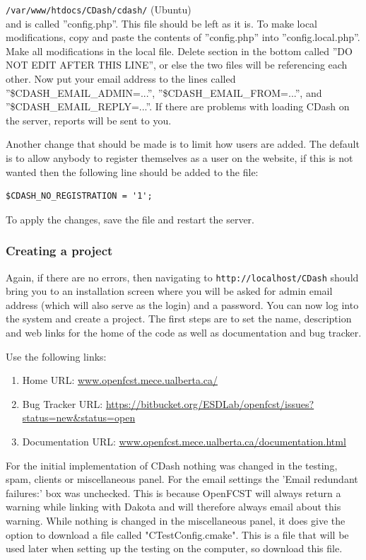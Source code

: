 \noindent \verb!/var/www/htdocs/CDash/cdash/! (Ubuntu)\\

\noindent and is called ''config.php''. This file should be left as it is. To make local modifications, copy and paste the contents of ''config.php'' into ''config.local.php''. Make all modifications in the local file. Delete section in the bottom called ''DO NOT EDIT AFTER THIS LINE'', or else the two files will be referencing each other. Now put your email address to the lines called ''\$CDASH\_EMAIL\_ADMIN=...'', ''\$CDASH\_EMAIL\_FROM=...'', and ''\$CDASH\_EMAIL\_REPLY=...''. If there are problems with loading CDash on the server, reports will be sent to you.

Another change that should be made is to limit how users are added. The default is to allow anybody to register themselves as a user on the website, if this is not wanted then the following line should be added to the file:

\small \begin{lstlisting}
$CDASH_NO_REGISTRATION = '1';
\end{lstlisting}\normalsize

\noindent To apply the changes, save the file and restart the server.

\subsubsection{Creating a project}

Again, if there are no errors, then navigating to \verb!http://localhost/CDash! should bring you to an installation screen where you will be asked for admin email address (which will also serve as the login) and a password. You can now log into the system and create a project. The first steps are to set the name, description and web links for the home of the code as well as documentation and bug tracker. 

Use the following links:

\begin{enumerate}
\item Home URL: \url{www.openfcst.mece.ualberta.ca/}
\item Bug Tracker URL: \url{https://bitbucket.org/ESDLab/openfcst/issues?status=new&status=open}
\item Documentation URL: \url{www.openfcst.mece.ualberta.ca/documentation.html}
\end{enumerate}

For the initial implementation of CDash nothing was changed in the testing, spam, clients or miscellaneous panel. For the email settings the 'Email redundant failures:' box was unchecked. This is because OpenFCST will always return a warning while linking with Dakota and will therefore always email about this warning. While nothing is changed in the miscellaneous panel, it does give the option to download a file called "CTestConfig.cmake". This is a file that will be used later when setting up the testing on the computer, so download this file. 

